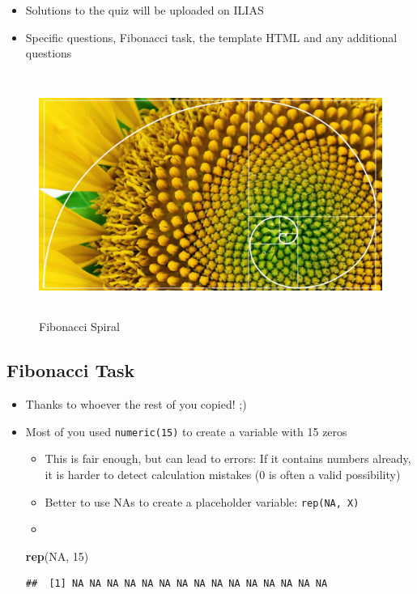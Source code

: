 \documentclass[
]{book}
\newenvironment{Shaded}{\begin{snugshade}}{\end{snugshade}}
\newcommand{\ConstantTok}[1]{\textcolor[rgb]{0.56,0.35,0.01}{#1}}
\newcommand{\DecValTok}[1]{\textcolor[rgb]{0.00,0.00,0.81}{#1}}
\newcommand{\FunctionTok}[1]{\textcolor[rgb]{0.13,0.29,0.53}{\textbf{#1}}}
\newcommand{\NormalTok}[1]{#1}
\providecommand{\tightlist}{%
  \setlength{\itemsep}{0pt}\setlength{\parskip}{0pt}}
\begin{document}
\begin{itemize}
\tightlist
\item
  Solutions to the quiz will be uploaded on ILIAS
\item
  Specific questions, Fibonacci task, the template HTML and any additional questions
\end{itemize}

\begin{figure}
\centering
\includegraphics[width=\textwidth,height=3.125in]{./img/fibonacci.jpg}
\caption{Fibonacci Spiral}
\end{figure}

\subsection{Fibonacci Task}\label{fibonacci-task}

\begin{itemize}
\tightlist
\item
  Thanks to whoever the rest of you copied! ;)
\item
  Most of you used \texttt{numeric(15)} to create a variable with 15 zeros

  \begin{itemize}
  \tightlist
  \item
    This is fair enough, but can lead to errors: If it contains numbers already, it is harder to detect calculation mistakes (0 is often a valid possibility)
  \item
    Better to use NAs to create a placeholder variable: \texttt{rep(NA,\ X)}
  \item
  \end{itemize}

\begin{Shaded}
\begin{Highlighting}[]
\FunctionTok{rep}\NormalTok{(}\ConstantTok{NA}\NormalTok{, }\DecValTok{15}\NormalTok{)}
\end{Highlighting}
\end{Shaded}

\begin{verbatim}
##  [1] NA NA NA NA NA NA NA NA NA NA NA NA NA NA NA
\end{verbatim}
\end{itemize}
\end{document}
